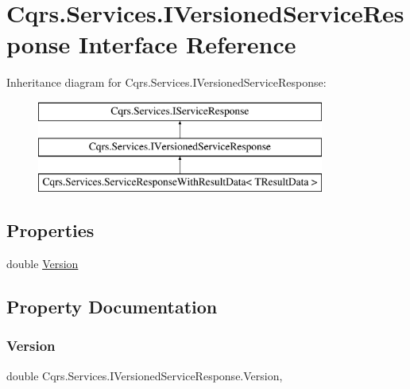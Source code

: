 \hypertarget{interfaceCqrs_1_1Services_1_1IVersionedServiceResponse}{}\section{Cqrs.\+Services.\+I\+Versioned\+Service\+Response Interface Reference}
\label{interfaceCqrs_1_1Services_1_1IVersionedServiceResponse}
Inheritance diagram for Cqrs.\+Services.\+I\+Versioned\+Service\+Response\+:\begin{figure}[H]
\begin{center}
\leavevmode
\includegraphics[height=3.000000cm]{interfaceCqrs_1_1Services_1_1IVersionedServiceResponse}
\end{center}
\end{figure}
\subsection*{Properties}
\begin{DoxyCompactItemize}
\item 
double \hyperlink{interfaceCqrs_1_1Services_1_1IVersionedServiceResponse_a74db5cc9544e83d9855370ca8e3ac691_a74db5cc9544e83d9855370ca8e3ac691}{Version}
\end{DoxyCompactItemize}


\subsection{Property Documentation}
\mbox{\label{interfaceCqrs_1_1Services_1_1IVersionedServiceResponse_a74db5cc9544e83d9855370ca8e3ac691_a74db5cc9544e83d9855370ca8e3ac691}} 
\subsubsection{\texorpdfstring{Version}{Version}}
{\footnotesize\ttfamily double Cqrs.\+Services.\+I\+Versioned\+Service\+Response.\+Version\hspace{0.3cm}{\ttfamily [get]}, {\ttfamily [set]}}

